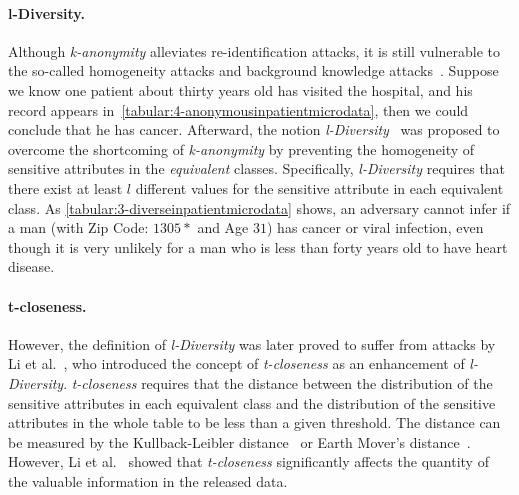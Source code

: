 \paragraph{l-Diversity.}
Although \textit{k-anonymity} alleviates re-identification attacks, it is still vulnerable to the so-called homogeneity attacks and background knowledge attacks~\cite{machanavajjhala2007diversity}. Suppose we know one patient about thirty years old has visited the hospital, and his record appears in~\autoref{tabular:4-anonymousinpatientmicrodata}, then we could conclude that he has cancer. Afterward, the notion \textit{l-Diversity}~\cite{machanavajjhala2007diversity} was proposed to overcome the shortcoming of \textit{k-anonymity} by preventing the homogeneity of sensitive attributes in the \textit{equivalent} classes. Specifically, \textit{l-Diversity} requires that there exist at least $l$ different values for the sensitive attribute in each equivalent class. As \autoref{tabular:3-diverseinpatientmicrodata} shows, an adversary cannot infer if a man (with Zip Code: $1305*$ and Age $31$) has cancer or viral infection, even though it is very unlikely for a man who is less than forty years old to have heart disease.

\paragraph{t-closeness.}
However, the definition of \textit{l-Diversity} was later proved to suffer from attacks by Li et al.~\cite{li2007t}, who introduced the concept of \textit{t-closeness} as an enhancement of \textit{l-Diversity}. \textit{t-closeness} requires that the distance between the distribution of the sensitive attributes in each equivalent class and the distribution of the sensitive attributes in the whole table to be less than a given threshold. The distance can be measured by the Kullback-Leibler distance~\cite{kullback1951information} or Earth Mover's distance~\cite{rubner2000earth}. However, Li et al.~\cite{li2009closeness} showed that \textit{t-closeness} significantly affects the quantity of the valuable information in the released data.

